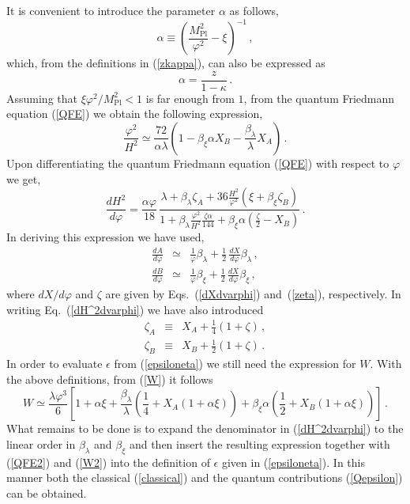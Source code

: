 \documentclass[aps,12pt,superscriptaddress,preprintnumbers,
                secnumarabic,nofootinbib,showpacs]{revtex4}
\begin{document}
It is convenient to introduce the parameter $\alpha$ as follows,
\begin{equation}
\alpha \equiv \left(\frac{M_{\mathrm{Pl}}^2}{\varphi^2}-
\xi\right)^{-1}\,,
\end{equation}
which, from the definitions in (\ref{zkappa}), can also be
expressed as
\begin{equation}
\alpha = \frac{z}{1-\kappa}\,.\label{alpha}
\end{equation}
Assuming that $\xi{\varphi^2}/{M_{\mathrm{Pl}}^2}<1$ is far
enough from $1$, from the quantum Friedmann
equation (\ref{QFE}) we obtain the following expression,
\begin{equation}
\frac{\varphi^2}{H^2} \simeq
\frac{72}{\alpha\lambda}\left(1-\beta_{\xi}\alpha X_B -
\frac{\beta_{\lambda}}{\lambda}X_A\right)\,.\label{QFE2}
\end{equation}
Upon differentiating the quantum Friedmann
equation (\ref{QFE}) with respect to $\varphi$ we get,
\begin{equation}
\frac{dH^2}{d\varphi} = \frac{\alpha\varphi}{18}\,\frac{\lambda +
\beta_{\lambda}\zeta_A +
36\frac{H^2}{\varphi^2}\left(\xi+\beta_{\xi}\zeta_B\right)}{1+\beta_{\lambda}\frac{\varphi^2}{H^2}\frac{\zeta\alpha}{144}+
\beta_{\xi}\alpha\left(\frac{\zeta}{2}-X_B\right)}\label{dH^2dvarphi}\,.
\end{equation}
In deriving this expression we have used,
\begin{eqnarray}
\frac{dA}{d\varphi} &\simeq& \frac{1}{\varphi}\beta_{\lambda}
+\frac{1}{2}\,\frac{dX}{d\varphi}\beta_{\lambda}\,,\nonumber\\
\frac{dB}{d\varphi} &\simeq& \frac{1}{\varphi}\beta_{\xi}
+\frac{1}{2}\,\frac{dX}{d\varphi}\beta_{\xi}\,,
\end{eqnarray}
where ${dX}/{d\varphi}$ and $\zeta$ are given by Eqs.~(\ref{dXdvarphi})
and~(\ref{zeta}), respectively. In writing
Eq.~(\ref{dH^2dvarphi}) we have also introduced
\begin{eqnarray}
\zeta_A &\equiv& X_A+ \frac14(1+\zeta)\,,
\nonumber\\
\zeta_B &\equiv& X_B+\frac12(1+\zeta)\,.
\end{eqnarray}
In order to evaluate $\epsilon$ from (\ref{epsiloneta}) we still need the
expression for $W$. With the above definitions, from (\ref{W}) it
follows
\begin{equation}
W \simeq \frac{\lambda\varphi^3}{6}\left[1+\alpha\xi
+\frac{\beta_{\lambda}}{\lambda}\left(\frac14 +X_A(1+\alpha\xi)\right)
 +\beta_{\xi}\alpha\left(\frac12+X_B(1+\alpha\xi)\right)\right]
\,.
\label{W2}
\end{equation}
What remains to be done is to expand the denominator in
(\ref{dH^2dvarphi}) to the linear order in $\beta_{\lambda}$ and
$\beta_{\xi}$ and then insert the resulting expression together
with (\ref{QFE2}) and (\ref{W2}) into the definition of $\epsilon$ given in
(\ref{epsiloneta}). In this manner both the classical
(\ref{classical}) and the quantum contributions ({\ref{Qepsilon}}) can
be obtained.
\end{document}
